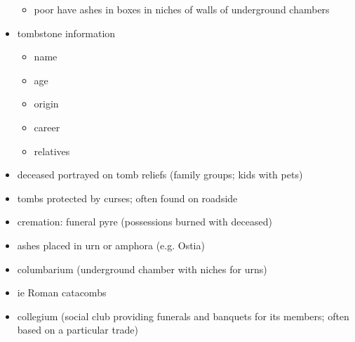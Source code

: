 \documentclass[12pt, twoside]{article}
\begin{document}
\begin{itemize}
\begin{itemize}
	\item poor have ashes in boxes in niches of walls of underground chambers
	\end{itemize}
\item tombstone information
	\begin{itemize}
	\item name
	\item age
	\item origin
	\item career
	\item relatives
	\end{itemize}
\item deceased portrayed on tomb reliefs (family groups; kids with pets)
\item tombs protected by curses; often found on roadside
\item cremation: funeral pyre (possessions burned with deceased)
\item ashes placed in urn or amphora (e.g. Ostia)
\item columbarium (underground chamber with niches for urns)
\item ie Roman catacombs
\item collegium (social club providing funerals and banquets for its members; often based on a particular trade)
\end{itemize}
\end{document}
